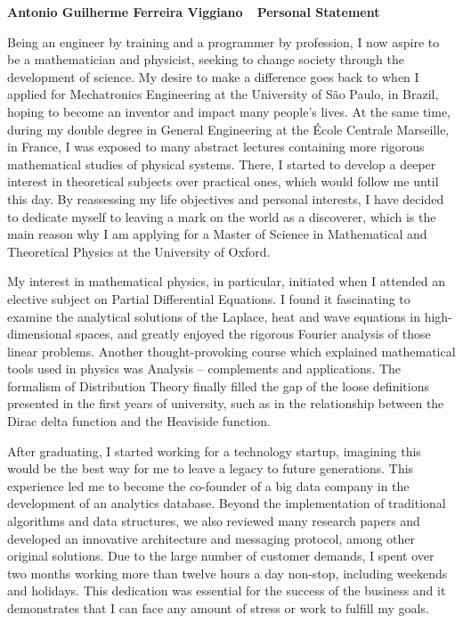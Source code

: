 \documentclass[10pt]{article}
\def\firstname{Antonio Guilherme }
\def\familyname{Ferreira Viggiano}
\def\subj{Personal Statement}
\def\FileTitle{\firstname\familyname~\textemdash~\subj}
\begin{document}
\sffamily %

{\bfseries \FileTitle}



Being an engineer by training and a programmer by profession, I now aspire to be a mathematician and physicist, seeking to change society through the development of science. My desire to make a difference goes back to when I applied for Mechatronics Engineering at the University of São Paulo, in Brazil, hoping to become an inventor and impact many people's lives. At the same time, during my double degree in General Engineering at the École Centrale Marseille, in France, I was exposed to many abstract lectures containing more rigorous mathematical studies of physical systems. There, I started to develop a deeper interest in theoretical subjects over practical ones, which would follow me until this day. By reassessing my life objectives and personal interests, I have decided to dedicate myself to leaving a mark on the world as a discoverer, which is the main reason why I am applying for a Master of Science in Mathematical and Theoretical Physics at the University of Oxford.

My interest in mathematical physics, in particular, initiated when I attended an elective subject on Partial Differential Equations. I found it fascinating to examine the analytical solutions of the Laplace, heat and wave equations in high-dimensional spaces, and greatly enjoyed the rigorous Fourier analysis of those linear problems. Another thought-provoking course which explained mathematical tools used in physics was Analysis -- complements and applications. The formalism of Distribution Theory finally filled the gap of the loose definitions presented in the first years of university, such as in the relationship between the Dirac delta function and the Heaviside function.

After graduating, I started working for a technology startup, imagining this would be the best way for me to leave a legacy to future generations. This experience led me to become the co-founder of a big data company in the development of an analytics database. Beyond the implementation of traditional algorithms and data structures, we also reviewed many research papers and developed an innovative architecture and messaging protocol, among other original solutions. Due to the large number of customer demands, I spent over two months working more than twelve hours a day non-stop, including weekends and holidays. This dedication was essential for the success of the business and it demonstrates that I can face any amount of stress or work to fulfill my goals.
\end{document}
